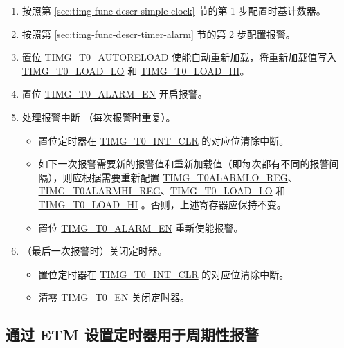 \documentclass[main\_\_CN.tex]{subfiles}
\begin{document}
\begin{enumerate}
    \item 按照第 \ref{sec:timg-func-descr-simple-clock} 节的第 1 步配置时基计数器。
    \item 按照第 \ref{sec:timg-func-descr-timer-alarm} 节的第 2 步配置报警。
    \item 置位 \hyperref[fielddesc:TIMGTXAUTORELOAD]{TIMG\_T0\_AUTORELOAD} 使能自动重新加载，将重新加载值写入 \hyperref[fielddesc:TIMGTXLOADLO]{TIMG\_T0\_LOAD\_LO} 和 \hyperref[fielddesc:TIMGTXLOADHI]{TIMG\_T0\_LOAD\_HI}。
    \item 置位 \hyperref[fielddesc:TIMGTXALARMEN]{TIMG\_T0\_ALARM\_EN} 开启报警。
    \item 处理报警中断 （每次报警时重复）。
    \begin{itemize}
        \item 置位定时器在 \hyperref[fielddesc:TIMGT0INTCLR]{TIMG\_T0\_INT\_CLR} 的对应位清除中断。
        \item 如下一次报警需要新的报警值和重新加载值（即每次都有不同的报警间隔），则应根据需要重新配置 \hyperref[regdesc:TIMGTXALARMLOREG]{TIMG\_T0ALARMLO\_REG}、\hyperref[regdesc:TIMGTXALARMHIREG]{TIMG\_T0ALARMHI\_REG}、\hyperref[fielddesc:TIMGTXLOADLO]{TIMG\_T0\_LOAD\_LO} 和 \hyperref[fielddesc:TIMGTXLOADHI]{TIMG\_T0\_LOAD\_HI} 。否则，上述寄存器应保持不变。
        \item 置位 \hyperref[fielddesc:TIMGTXALARMEN]{TIMG\_T0\_ALARM\_EN} 重新使能报警。
    \end{itemize}
    \item （最后一次报警时）关闭定时器。
    \begin{itemize}
        \item 置位定时器在 \hyperref[fielddesc:TIMGT0INTCLR]{TIMG\_T0\_INT\_CLR} 的对应位清除中断。
        \item 清零 \hyperref[fielddesc:TIMGTXEN]{TIMG\_T0\_EN} 关闭定时器。
    \end{itemize}
\end{enumerate}







\subsection{通过 ETM 设置定时器用于周期性报警} \label{sec:timg-conf-etm}
\end{document}
